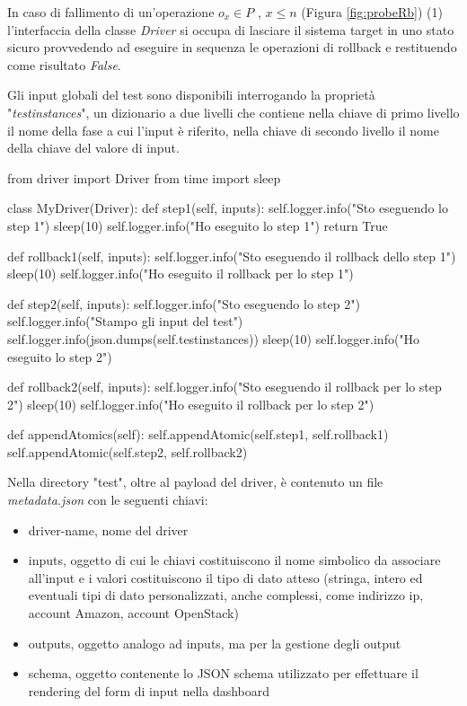 \documentclass[../main.tex]{subfiles}
\begin{document}
In caso di fallimento di un'operazione $o_x \in P$ , $x \leq n$ (Figura \ref{fig:probeRb}) (1) l'interfaccia della classe \textit{Driver} si occupa di lasciare il sistema target in uno stato sicuro provvedendo ad eseguire in sequenza le operazioni di rollback e restituendo come risultato \textit{False}.

Gli  input globali del test sono  disponibili interrogando la proprietà "\textit{testinstances}", un dizionario a due livelli che contiene nella chiave di primo livello il nome della fase a cui l'input è riferito, nella chiave di secondo livello il nome della chiave del valore di input.

\begin{python}

from driver import Driver
from time import sleep

class MyDriver(Driver):
    def step1(self, inputs):
        self.logger.info("Sto eseguendo lo step 1")
        sleep(10)
        self.logger.info("Ho eseguito lo step 1")
        return True

    def rollback1(self, inputs):
        self.logger.info("Sto eseguendo il rollback dello step 1")
        sleep(10)
        self.logger.info("Ho eseguito il rollback per lo step 1")

    def step2(self, inputs):
        self.logger.info("Sto eseguendo lo step 2")
        self.logger.info("Stampo gli input del test")
        self.logger.info(json.dumps(self.testinstances))
        sleep(10)
        self.logger.info("Ho eseguito lo step 2")
        
    def rollback2(self, inputs):
        self.logger.info("Sto eseguendo il rollback per lo step 2")
        sleep(10)        
        self.logger.info("Ho eseguito il rollback per lo step 2")

    def appendAtomics(self):
        self.appendAtomic(self.step1, self.rollback1)
        self.appendAtomic(self.step2, self.rollback2)
        
\end{python}

Nella directory "test", oltre al payload del driver, è contenuto un file \textit{metadata.json} 
con le seguenti chiavi:
\begin{itemize}
    \item driver-name, nome del driver
    \item inputs, oggetto di cui le chiavi costituiscono il nome simbolico da associare all'input e i valori costituiscono il tipo di dato atteso (stringa, intero ed eventuali tipi di dato personalizzati, anche complessi, come indirizzo ip, account Amazon, account OpenStack)
    \item outputs, oggetto analogo ad inputs, ma per la gestione degli output 
    \item schema, oggetto contenente lo JSON schema utilizzato per effettuare il rendering del form di input nella dashboard
\end{itemize}
\end{document}
